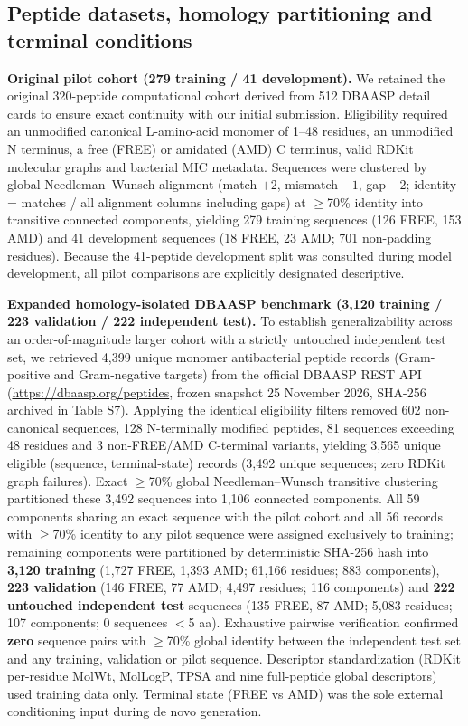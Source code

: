 \documentclass[unnumsec,webpdf,contemporary,large]{oup-authoring-template}
\newcommand{\rev}[1]{#1}
\begin{document}
\subsection{Peptide datasets, homology partitioning and terminal conditions}

\textbf{Original pilot cohort (279 training / 41 development).} We retained the original 320-peptide computational cohort derived from 512 DBAASP detail cards \cite{ref10} to ensure exact continuity with our initial submission. Eligibility required an unmodified canonical L-amino-acid monomer of 1--48 residues, an unmodified N terminus, a free (FREE) or amidated (AMD) C terminus, valid RDKit molecular graphs and bacterial MIC metadata. Sequences were clustered by global Needleman--Wunsch alignment \cite{refNW} (match $+2$, mismatch $-1$, gap $-2$; identity = matches / all alignment columns including gaps) at $\geq$70\% identity into transitive connected components, yielding 279 training sequences (126 FREE, 153 AMD) and 41 development sequences (18 FREE, 23 AMD; 701 non-padding residues). Because the 41-peptide development split was consulted during model development, all pilot comparisons are explicitly designated descriptive.

\rev{\textbf{Expanded homology-isolated DBAASP benchmark (3,120 training / 223 validation / 222 independent test).} To establish generalizability across an order-of-magnitude larger cohort with a strictly untouched independent test set, we retrieved 4,399 unique monomer antibacterial peptide records (Gram-positive and Gram-negative targets) from the official DBAASP REST API (\url{https://dbaasp.org/peptides}, frozen snapshot 25 November 2026, SHA-256 archived in Table S7). Applying the identical eligibility filters removed 602 non-canonical sequences, 128 N-terminally modified peptides, 81 sequences exceeding 48 residues and 3 non-FREE/AMD C-terminal variants, yielding 3,565 unique eligible (sequence, terminal-state) records (3,492 unique sequences; zero RDKit graph failures). Exact $\geq$70\% global Needleman--Wunsch transitive clustering partitioned these 3,492 sequences into 1,106 connected components. All 59 components sharing an exact sequence with the pilot cohort and all 56 records with $\geq$70\% identity to any pilot sequence were assigned exclusively to training; remaining components were partitioned by deterministic SHA-256 hash into \textbf{3,120 training} (1,727 FREE, 1,393 AMD; 61,166 residues; 883 components), \textbf{223 validation} (146 FREE, 77 AMD; 4,497 residues; 116 components) and \textbf{222 untouched independent test} sequences (135 FREE, 87 AMD; 5,083 residues; 107 components; 0 sequences $<$5 aa). Exhaustive pairwise verification confirmed \textbf{zero} sequence pairs with $\geq$70\% global identity between the independent test set and any training, validation or pilot sequence. Descriptor standardization (RDKit per-residue MolWt, MolLogP, TPSA and nine full-peptide global descriptors) used training data only. Terminal state (FREE vs AMD) was the sole external conditioning input during de novo generation.}
\end{document}
